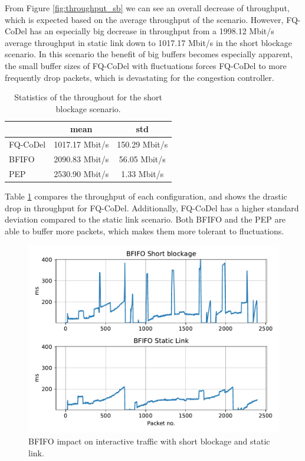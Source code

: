 \documentclass[a4paper,english, 12pt]{report}
\begin{document}
From Figure \ref{fig:throughput_sb} we can see an overall decrease of throughput, which is expected based on the average throughput of the scenario. However, FQ-CoDel has an especially big decrease in throughput from a 1998.12 Mbit/s average throughput in static link down to 1017.17 Mbit/s in the short blockage scenario. In this scenario the benefit of big buffers becomes especially apparent, the small buffer sizes of FQ-CoDel with fluctuations forces FQ-CoDel to more frequently drop packets, which is devastating for the congestion controller.\\

\begin{table}[h!]
\centering
\begin{tabular}{l|c|c}
\hline
 & \textbf{mean} & \textbf{std}  \\ 
\hline
FQ-CoDel & 1017.17 Mbit/s & 150.29 Mbit/s \\
BFIFO    & 2090.83 Mbit/s & 56.05 Mbit/s \\
PEP      & 2530.90 Mbit/s & 1.33 Mbit/s \\
\hline
\end{tabular}
\caption{Statistics of the throughout for the short blockage scenario.}
\label{tab:throughput_sb_table}
\end{table}

Table \ref{tab:throughput_sb_table} compares the throughput of each configuration, and shows the drastic drop in throughput for FQ-CoDel. Additionally, FQ-CoDel has a higher standard deviation compared to the static link scenario. Both BFIFO and the PEP are able to buffer more packets, which makes them more tolerant to fluctuations.\\

\begin{figure}[!h!] %
	\centering
	\includegraphics[scale=0.70]{../diagrams/witestlab/throughput/throughput_bfifo_sb_sl.pdf}
  	\caption{BFIFO impact on interactive traffic with short blockage and static link.}
  	\label{fig:throughput_bfifo_sb_sl}
\end{figure}
\end{document}
